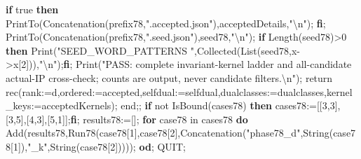 \documentclass[
  10pt,
  letterpaper,
]{article}
\newenvironment{Shaded}{}{}
\newcommand{\BuiltInTok}[1]{\textcolor[rgb]{0.00,0.50,0.00}{#1}}
\newcommand{\ConstantTok}[1]{\textcolor[rgb]{0.53,0.00,0.00}{#1}}
\newcommand{\ControlFlowTok}[1]{\textcolor[rgb]{0.00,0.44,0.13}{\textbf{#1}}}
\newcommand{\ExtensionTok}[1]{#1}
\newcommand{\FloatTok}[1]{\textcolor[rgb]{0.25,0.63,0.44}{#1}}
\newcommand{\FunctionTok}[1]{\textcolor[rgb]{0.02,0.16,0.49}{#1}}
\newcommand{\NormalTok}[1]{#1}
\newcommand{\OperatorTok}[1]{\textcolor[rgb]{0.40,0.40,0.40}{#1}}
\newcommand{\StringTok}[1]{\textcolor[rgb]{0.25,0.44,0.63}{#1}}
\newcommand{\VariableTok}[1]{\textcolor[rgb]{0.10,0.09,0.49}{#1}}
\begin{document}
\begin{Shaded}
\begin{Highlighting}[]
 \ControlFlowTok{if} \ConstantTok{true} \ControlFlowTok{then}
  \BuiltInTok{PrintTo}\NormalTok{(}\BuiltInTok{Concatenation}\NormalTok{(}\VariableTok{prefix78}\OperatorTok{,}\StringTok{".accepted.json"}\NormalTok{)}\OperatorTok{,}\VariableTok{acceptedDetails}\OperatorTok{,}\StringTok{"\textbackslash{}n"}\NormalTok{)}\OperatorTok{;}
 \ControlFlowTok{fi}\OperatorTok{;}
 \BuiltInTok{PrintTo}\NormalTok{(}\BuiltInTok{Concatenation}\NormalTok{(}\VariableTok{prefix78}\OperatorTok{,}\StringTok{".seed.json"}\NormalTok{)}\OperatorTok{,}\VariableTok{seed78}\OperatorTok{,}\StringTok{"\textbackslash{}n"}\NormalTok{)}\OperatorTok{;}
 \ControlFlowTok{if} \BuiltInTok{Length}\NormalTok{(}\VariableTok{seed78}\NormalTok{)}\OperatorTok{\textgreater{}}\FloatTok{0} \ControlFlowTok{then} \BuiltInTok{Print}\NormalTok{(}\StringTok{"SEED\_WORD\_PATTERNS "}\OperatorTok{,}\BuiltInTok{Collected}\NormalTok{(}\BuiltInTok{List}\NormalTok{(}\VariableTok{seed78}\OperatorTok{,}\VariableTok{x}\OperatorTok{{-}\textgreater{}}\VariableTok{x}\NormalTok{[}\FloatTok{2}\NormalTok{]))}\OperatorTok{,}\StringTok{"\textbackslash{}n"}\NormalTok{)}\OperatorTok{;}\ControlFlowTok{fi}\OperatorTok{;}
 \BuiltInTok{Print}\NormalTok{(}\StringTok{"PASS: complete invariant{-}kernel ladder and all{-}candidate actual{-}IP cross{-}check; counts are output, never candidate filters.\textbackslash{}n"}\NormalTok{)}\OperatorTok{;}
 \ExtensionTok{return} \ExtensionTok{rec}\NormalTok{(}\VariableTok{rank}\OperatorTok{:=}\VariableTok{d}\OperatorTok{,}\VariableTok{ordered}\OperatorTok{:=}\VariableTok{accepted}\OperatorTok{,}\VariableTok{selfdual}\OperatorTok{:=}\VariableTok{selfdual}\OperatorTok{,}\VariableTok{dualclasses}\OperatorTok{:=}\VariableTok{dualclasses}\OperatorTok{,}\VariableTok{kernel\_keys}\OperatorTok{:=}\VariableTok{acceptedKernels}\NormalTok{)}\OperatorTok{;}
\FunctionTok{end}\OperatorTok{;;}
\ControlFlowTok{if} \ConstantTok{not} \BuiltInTok{IsBound}\NormalTok{(}\VariableTok{cases78}\NormalTok{) }\ControlFlowTok{then} \VariableTok{cases78}\OperatorTok{:=}\NormalTok{[[}\FloatTok{3}\OperatorTok{,}\FloatTok{3}\NormalTok{]}\OperatorTok{,}\NormalTok{[}\FloatTok{3}\OperatorTok{,}\FloatTok{5}\NormalTok{]}\OperatorTok{,}\NormalTok{[}\FloatTok{4}\OperatorTok{,}\FloatTok{3}\NormalTok{]}\OperatorTok{,}\NormalTok{[}\FloatTok{5}\OperatorTok{,}\FloatTok{1}\NormalTok{]]}\OperatorTok{;}\ControlFlowTok{fi}\OperatorTok{;}
\VariableTok{results78}\OperatorTok{:=}\NormalTok{[]}\OperatorTok{;}
\ControlFlowTok{for} \VariableTok{case78} \ExtensionTok{in} \VariableTok{cases78} \ControlFlowTok{do}
 \BuiltInTok{Add}\NormalTok{(}\VariableTok{results78}\OperatorTok{,}\VariableTok{Run78}\NormalTok{(}\VariableTok{case78}\NormalTok{[}\FloatTok{1}\NormalTok{]}\OperatorTok{,}\VariableTok{case78}\NormalTok{[}\FloatTok{2}\NormalTok{]}\OperatorTok{,}\BuiltInTok{Concatenation}\NormalTok{(}\StringTok{"phase78\_d"}\OperatorTok{,}\BuiltInTok{String}\NormalTok{(}\VariableTok{case78}\NormalTok{[}\FloatTok{1}\NormalTok{])}\OperatorTok{,}\StringTok{"\_k"}\OperatorTok{,}\BuiltInTok{String}\NormalTok{(}\VariableTok{case78}\NormalTok{[}\FloatTok{2}\NormalTok{]))))}\OperatorTok{;}
\ControlFlowTok{od}\OperatorTok{;}
\VariableTok{QUIT}\OperatorTok{;}
\end{Highlighting}
\end{Shaded}
\end{document}
